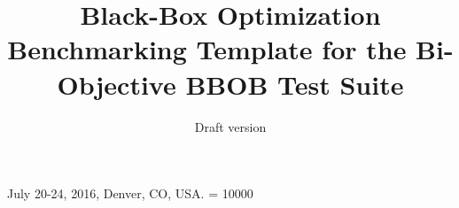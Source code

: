 \documentclass{sig-alternate}
\begin{document}
%
 {July 20-24, 2016, Denver, CO, USA.}
\widowpenalty = 10000

\title{Black-Box Optimization Benchmarking Template for the Bi-Objective BBOB Test Suite
}
\subtitle{Draft version
}

%
%
%
%
%
\end{document}

